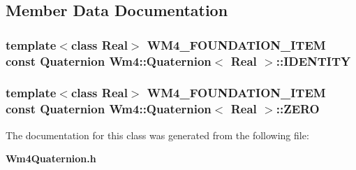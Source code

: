\subsection{Member Data Documentation}
\subsubsection{\setlength{\rightskip}{0pt plus 5cm}template$<$class Real$>$ WM4\_\-FOUNDATION\_\-ITEM const {\bf Quaternion} {\bf Wm4::Quaternion}$<$ Real $>$::{\bf IDENTITY}\hspace{0.3cm}{\tt  [static]}}\label{classWm4_1_1Quaternion_0175525a86cac49cae5f80344d0e153e}


\subsubsection{\setlength{\rightskip}{0pt plus 5cm}template$<$class Real$>$ WM4\_\-FOUNDATION\_\-ITEM const {\bf Quaternion} {\bf Wm4::Quaternion}$<$ Real $>$::{\bf ZERO}\hspace{0.3cm}{\tt  [static]}}\label{classWm4_1_1Quaternion_ffff94f50a9f393355542f5ce16563f4}




The documentation for this class was generated from the following file:\begin{CompactItemize}
\item 
{\bf Wm4Quaternion.h}\end{CompactItemize}

